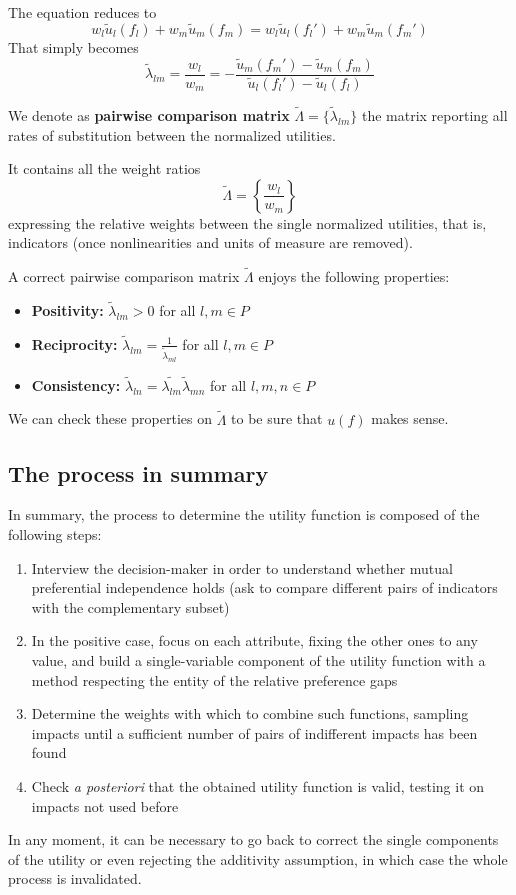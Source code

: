 The equation reduces to 
$$ w_l \tilde u_l (f_l) + w_m \tilde u_m (f_m) = w_l \tilde u_l (f_l') + w_m \tilde u_m (f_m') $$
That simply becomes
$$ \tilde \lambda_{lm} = \frac{w_l}{w_m} = - \frac{\tilde u_m (f_m') - \tilde u_m (f_m)}{\tilde u_l (f_l') - \tilde u_l (f_l)} $$

\begin{definition}
	We denote as \textbf{pairwise comparison matrix} $\tilde \Lambda = \{\tilde \lambda_{lm}\}$ the matrix reporting all rates of substitution between the normalized utilities.
\end{definition}

It contains all the weight ratios
$$ \tilde \Lambda = \left\{\frac{w_l}{w_m}\right\} $$
expressing the relative weights between the single normalized utilities, that is, indicators (once nonlinearities and units of measure are removed).

A correct pairwise comparison matrix $\tilde \Lambda$ enjoys the following properties:
\begin{itemize}
	\item \textbf{Positivity:} $\tilde \lambda_{lm} > 0$ for all $l,m \in P$
	
	\item \textbf{Reciprocity:} $\tilde \lambda_{lm} = \frac{1}{\tilde \lambda_{ml}}$ for all $l,m \in P$
	
	\item \textbf{Consistency:} $\tilde \lambda_{ln} = \tilde{ \lambda_{lm}} \tilde \lambda_{mn}$ for all $l,m,n \in P$
\end{itemize}
We can check these properties on $\tilde \Lambda$ to be sure that $u(f)$ makes sense.

\subsection{The process in summary}
\label{subsec:detfunctionsummary}

In summary, the process to determine the utility function is composed of the following steps: 
\begin{enumerate}
	\item Interview the decision-maker in order to understand whether mutual preferential independence holds (ask to compare different pairs of indicators with the complementary subset)
	
	\item In the positive case, focus on each attribute, fixing the other ones to any value, and build a single-variable component of the utility function with a method respecting the entity of the relative preference gaps
	
	\item Determine the weights with which to combine such functions, sampling impacts until a sufficient number of pairs of indifferent impacts has been found
	
	\item Check \textit{a posteriori} that the obtained utility function is valid, testing it on impacts not used before
\end{enumerate}

In any moment, it can be necessary to go back to correct the single components of the utility or even rejecting the additivity assumption, in which case the whole process is invalidated.

